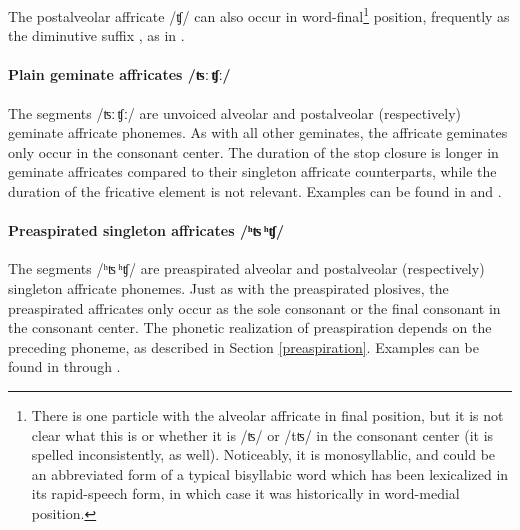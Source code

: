 The postalveolar affricate /ʧ/ can also occur in word-final\footnote{There is one particle  with the alveolar affricate in final position, but it is not clear what this is or whether it is /ʦ/ or /tʦ/ in the consonant center (it is spelled inconsistently, as well). Noticeably, it is monosyllablic, and could be an abbreviated form of a typical bisyllabic word which has been lexicalized in its rapid-speech form, in which case it was historically in word-medial position.} %
position, frequently as the diminutive suffix , as in .

\paragraph{Plain geminate affricates /ʦː\,ʧː/}
The segments /ʦː\,ʧː/ are unvoiced alveolar and postalveolar (respectively) geminate affricate phonemes. As with all other geminates, the affricate geminates only occur in the consonant center. The duration of the stop closure is longer in geminate affricates compared to their singleton affricate counterparts, while the duration of the fricative element is not relevant.
Examples can be found in  and .

\paragraph{Preaspirated singleton affricates /ʰʦ\,ʰʧ/}
The segments \mbox{/ʰʦ\,ʰʧ/} are preaspirated alveolar and postalveolar (respectively) singleton affricate phonemes. Just as with the preaspirated plosives, the preaspirated affricates only occur as the sole consonant or the final consonant in the consonant center. 
The phonetic realization of preaspiration depends on the preceding phoneme, as described in Section \ref{preaspiration}. 
Examples can be found in  through .

